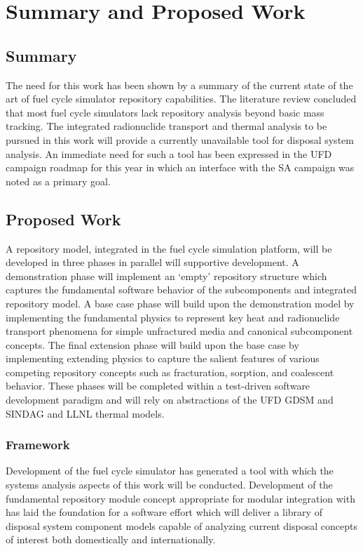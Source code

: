 \chapter{Summary and Proposed Work}\label{ch:future}

\section{Summary}

The need for this work has been shown by a summary of the current state of the 
art of fuel cycle simulator repository capabilities. The literature review 
concluded that most fuel cycle simulators lack repository analysis beyond basic 
mass tracking. The integrated radionuclide transport and thermal analysis to be 
pursued in this work will provide a currently unavailable tool for disposal 
system analysis. An immediate need for such a tool has been expressed in the 
\gls{UFD} campaign roadmap for this year in which an interface with the \gls{SA} 
campaign was noted as a primary goal. 

\section{Proposed Work}

A repository model, integrated in the \Cyclus fuel cycle simulation platform, 
will be developed in three phases in parallel will supportive \Cyclus 
development. A demonstration phase will implement an `empty' repository 
structure which captures the fundamental software behavior of the subcomponents 
and integrated repository model. A base case phase will build upon the 
demonstration model by implementing the fundamental physics to represent key heat 
and radionuclide transport phenomena for simple unfractured media and canonical  
subcomponent concepts. The final extension phase will build upon the base case 
by implementing extending physics to capture the salient features of various 
competing repository concepts such as fracturation, sorption, and coalescent 
behavior. These phases will be completed within a test-driven software 
development paradigm and will rely on abstractions of the \gls{UFD} \gls{GDSM} 
and \gls{SINDAG} and \gls{LLNL} thermal models.  

\subsection{\Cyclus Framework}

Development of the \Cyclus fuel cycle simulator has generated a tool with which 
the systems analysis aspects of this work will be conducted. Development of the  
fundamental repository module concept appropriate for modular integration with 
\Cyclus has laid the foundation for a software effort which will deliver a 
library of disposal system component models capable of analyzing current 
disposal concepts of interest both domestically and internationally.

